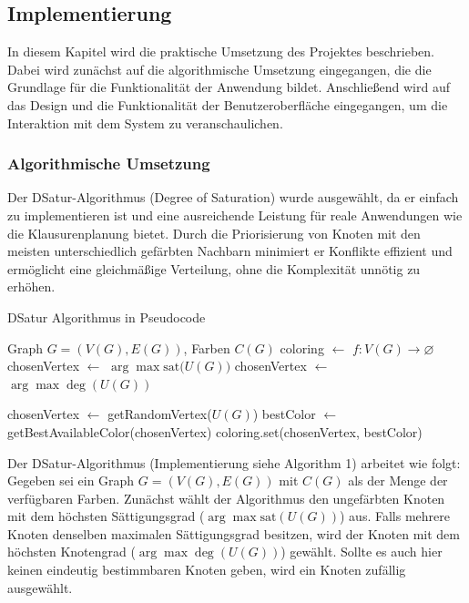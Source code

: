 \subsection{Implementierung}
In diesem Kapitel wird die praktische Umsetzung des Projektes beschrieben. Dabei wird zunächst auf die algorithmische Umsetzung eingegangen, die die Grundlage für die Funktionalität der Anwendung bildet. Anschließend wird auf das Design und die Funktionalität der Benutzeroberfläche eingegangen, um die Interaktion mit dem System zu veranschaulichen. 

\subsubsection{Algorithmische Umsetzung}
Der DSatur-Algorithmus (Degree of Saturation) wurde ausgewählt, da er einfach zu implementieren ist und eine ausreichende Leistung für reale Anwendungen wie die Klausurenplanung bietet. Durch die Priorisierung von Knoten mit den meisten unterschiedlich gefärbten Nachbarn minimiert er Konflikte effizient und ermöglicht eine gleichmäßige Verteilung, ohne die Komplexität unnötig zu erhöhen.
\begin{algorithm}
\caption{DSatur Algorithmus in Pseudocode}\label{alg:cap}
\begin{algorithmic}
\Require Graph $G = (V(G), E(G))$, Farben $C(G)$
\State coloring $\gets$ $f: V(G) \rightarrow \varnothing$
    \State chosenVertex $\gets$ $\arg \max \text{sat($U(G)$)}$
        \State chosenVertex $\gets$ $\arg \max \deg(U(G))$
        
            \State chosenVertex $\gets$ getRandomVertex($U(G)$)
        \EndIf
    \EndIf
    \State bestColor $\gets$ getBestAvailableColor(chosenVertex)
    \State coloring.set(chosenVertex, bestColor)
\EndWhile
\end{algorithmic}
\end{algorithm}
Der DSatur-Algorithmus (Implementierung siehe Algorithm 1) arbeitet wie folgt: Gegeben sei ein Graph $G = (V(G), E(G))$ mit $C(G)$ als der Menge der verfügbaren Farben. Zunächst wählt der Algorithmus den ungefärbten Knoten mit dem höchsten Sättigungsgrad ($\arg \max \text{sat}(U(G)) $) aus. Falls mehrere Knoten denselben maximalen Sättigungsgrad besitzen, wird der Knoten mit dem höchsten Knotengrad ($\arg \max \deg(U(G))$) gewählt. Sollte es auch hier keinen eindeutig bestimmbaren Knoten geben, wird ein Knoten zufällig ausgewählt.\\\\

